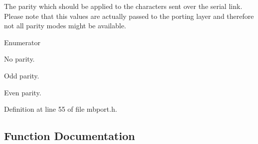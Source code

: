 The parity which should be applied to the characters sent over the serial link. Please note that this values are actually passed to the porting layer and therefore not all parity modes might be available. \begin{Desc}
\item[Enumerator]\par
\begin{description}
\item[{\em 
M\+B\+\_\+\+P\+A\+R\+\_\+\+N\+O\+NE\hypertarget{group__modbus_gga16ba85fa56bcd52a11a12576af445ccba36c1b70b68bc05d618632e3f975a557b}{}\label{group__modbus_gga16ba85fa56bcd52a11a12576af445ccba36c1b70b68bc05d618632e3f975a557b}
}]No parity. \item[{\em 
M\+B\+\_\+\+P\+A\+R\+\_\+\+O\+DD\hypertarget{group__modbus_gga16ba85fa56bcd52a11a12576af445ccba955fa6c30334314739ddceed6e749316}{}\label{group__modbus_gga16ba85fa56bcd52a11a12576af445ccba955fa6c30334314739ddceed6e749316}
}]Odd parity. \item[{\em 
M\+B\+\_\+\+P\+A\+R\+\_\+\+E\+V\+EN\hypertarget{group__modbus_gga16ba85fa56bcd52a11a12576af445ccba0415f4c7ede57e13a0cca698a8375dbd}{}\label{group__modbus_gga16ba85fa56bcd52a11a12576af445ccba0415f4c7ede57e13a0cca698a8375dbd}
}]Even parity. \end{description}
\end{Desc}


Definition at line 55 of file mbport.\+h.



\subsection{Function Documentation}
